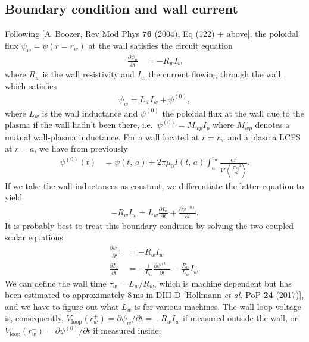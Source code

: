 \documentclass[11pt,a4paper]{article}
\newcommand{\rd}{\ensuremath{\mathrm{d}}}
\newcommand{\sub}[1]{\ensuremath{_{\text{#1}}}}
\begin{document}
\subsection{Boundary condition and wall current}
Following [A~Boozer, Rev Mod Phys {\bf 76} (2004), Eq (122) + above], the poloidal flux $\psi_w = \psi(r=r_w)$ at the wall satisfies the circuit equation
\begin{align}
\frac{\partial \psi_w}{\partial t} &= -R_w I_w
\end{align}
where $R_w$ is the wall resistivity and $I_w$ the current flowing through the wall, which satisfies
\begin{align}
\psi_w = L_w I_w + \psi^{(0)},
\end{align}
where $L_w$ is the wall inductance and $\psi^{(0)}$ the poloidal flux at the wall due to the plasma if the wall hadn't been there, i.e.~$\psi^{(0)} = M_{wp}I_p$ where $M_{wp}$ denotes a mutual wall-plasma inductance. For a wall located at $r=r_w$ and a plasma LCFS at $r=a$, we have from previously
\begin{align}
\psi^{(0)}(t) &= \psi(t,\,a) + 2\pi\mu_0 I(t,\,a) \int_a^{r_w} \frac{\rd r}{V'\left\langle \frac{|\nabla r|^2}{R^2}\right\rangle }.
\end{align}
If we take the wall inductances as constant, we differentiate the latter equation to yield
\begin{align}
-R_w I_w = L_w \frac{\partial I_w}{\partial t} + \frac{\partial \psi^{(0)}}{\partial t}.
\end{align}
It is probably best to treat this boundary condition by solving the two coupled scalar equations
\begin{align}
\frac{\partial \psi_w}{\partial t} &= -R_w I_w \nonumber \\
 \frac{\partial I_w}{\partial t} &= -\frac{ 1}{L_w}\frac{\partial \psi^{(0)}}{\partial t} -\frac{R_w}{L_w} I_w .
\end{align}
We can define the wall time $\tau_w = L_w/R_w$, which is machine dependent but has been estimated to approximately 8\,ms in DIII-D [Hollmann \emph{et al.} PoP {\bf 24} (2017)], and we have to figure out what $L_w$ is for various machines.
The wall loop voltage is, consequently, $V\sub{loop}(r_w^+) = \partial \psi_w/\partial t = -R_w I_w$ if measured outside the wall, or $V\sub{loop}(r_w^-) = \partial \psi^{(0)}/\partial t$ if measured inside.
\end{document}
